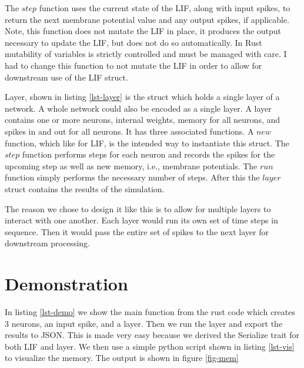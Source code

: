 \documentclass[12pt,english]{article}
\begin{document}
The $step$ function uses the current state of the LIF, along with input spikes, to return the next membrane potential value and any output spikes, if applicable.
Note, this function does not mutate the LIF in place, it produces the output necessary to update the LIF, but does not do so automatically.
In Rust mutability of variables is strictly controlled and must be managed with care.
I had to change this function to not mutate the LIF in order to allow for downstream use of the LIF struct.


Layer, shown in listing \ref{lst-layer} is the struct which holds a single layer of a network.
A whole network could also be encoded as a single layer. 
A layer contains one or more neurons, internal weights, memory for all neurons, and spikes in and out for all neurons.
It has three associated functions.
A $new$ function, which like for LIF, is the intended way to instantiate this struct.
The $step$ function performs steps for each neuron and records the spikes for the upcoming step as well as new memory, i.e., membrane potentials.
The $run$ function simply performs the necessary number of steps.
After this the $layer$ struct contains the results of the simulation.

The reason we chose to design it like this is to allow for multiple layers to interact with one another.
Each layer would run its own set of time steps in sequence.
Then it would pass the entire set of spikes to the next layer for downstream processing.


\section{Demonstration}

In listing \ref{lst-demo} we show the main function from the rust code which creates 3 neurons, an input spike, and a layer.
Then we run the layer and export the results to JSON.
This is made very easy because we derived the Serialize trait for both LIF and layer.
We then use a simple python script shown in listing \ref{lst-vis} to visualize the memory.
The output is shown in figure \ref{fig-mem}

\end{document}
